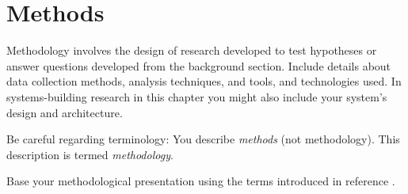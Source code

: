 \chapter{Methods}
\label{ch:methods}

Methodology involves the design of research developed to test hypotheses
or answer questions developed from the background section.
Include details about data collection methods, analysis techniques,
and tools, and technologies used.
In systems-building research in this chapter you might also include
your system's design and architecture.

Be careful regarding terminology: You describe \emph{methods} (not
methodology).  This description is termed \emph{methodology}.

Base your methodological presentation using the terms
introduced in reference \cite{SF18}.
